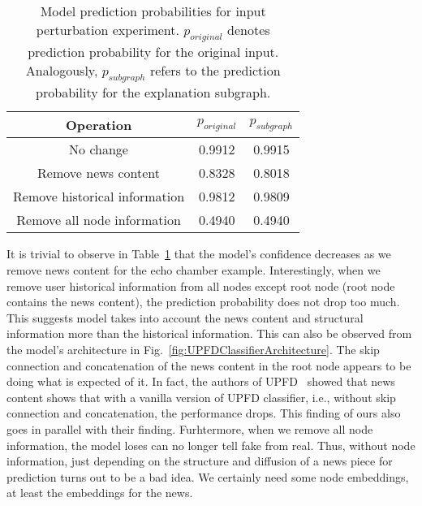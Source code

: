 \begin{table}
    \centering
    \begin{tabular}{c | c | c}
        \textbf{Operation}            & $p_{original}$ & $p_{subgraph}$ \\
        \hline
        No change                     & 0.9912         & 0.9915         \\
        \hline
        Remove news content           & 0.8328         & 0.8018         \\
        \hline
        Remove historical information & 0.9812         & 0.9809         \\
        \hline
        Remove all node information   & 0.4940         & 0.4940         \\
    \end{tabular}
    \caption[Model prediction probabilities for input perturbation experiment.]{Model prediction probabilities for input perturbation experiment. $p_{original}$ denotes prediction probability for the original input. Analogously, $p_{subgraph}$ refers to the prediction probability for the explanation subgraph.}
    \label{tab:echoChamberFeatureRemovalExperimentResults}
\end{table}
It is trivial to observe in Table~\ref{tab:echoChamberFeatureRemovalExperimentResults} that the model's confidence decreases as we remove news content for the echo chamber example. Interestingly, when we remove user historical information from all nodes except root node (root node contains the news content), the prediction probability does not drop too much. This suggests model takes into account the news content and structural information more than the historical information. This can also be observed from the model's architecture in Fig.~\ref{fig:UPFDClassifierArchitecture}. The skip connection and concatenation of the news content in the root node appears to be doing what is expected of it. In fact, the authors of UPFD~\parencite{UPFD_Dataset_Shu} showed that news content shows that with a vanilla version of UPFD classifier, i.e., without skip connection and concatenation, the performance drops. This finding of ours also goes in parallel with their finding. Furhtermore, when we remove all node information, the model loses can no longer tell fake from real. Thus, without node information, just depending on the structure and diffusion of a news piece for prediction turns out to be a bad idea. We certainly need some node embeddings, at least the embeddings for the news.\\
